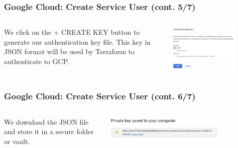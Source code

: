 \documentclass[aspectratio=169]{beamer}
\begin{document}
\begin{frame}
	\frametitle{Google Cloud: Create Service User (cont. 5/7)}
	\begin{columns}
		\begin{column}{0.5\textwidth}
		We click on the + CREATE KEY button to generate our authentication key file. This key in JSON format will be used by Terraform to authenticate to GCP.
		\end{column}
		\begin{column}{0.5\textwidth}
			\begin{center}
				\includegraphics[width=0.75\textwidth]{../images/gcp-serv-acct5.png}
			\end{center}
		\end{column}
	\end{columns}
\end{frame}

\begin{frame}
	\frametitle{Google Cloud: Create Service User (cont. 6/7)}
	\begin{columns}
		\begin{column}{0.5\textwidth}
			We download the JSON file and store it in a secure folder or vault.
		\end{column}
		\begin{column}{0.5\textwidth}
			\begin{center}
				\includegraphics[width=0.75\textwidth]{../images/gcp-serv-acct6.png}
			\end{center}
		\end{column}
	\end{columns}
\end{frame}
\end{document}

